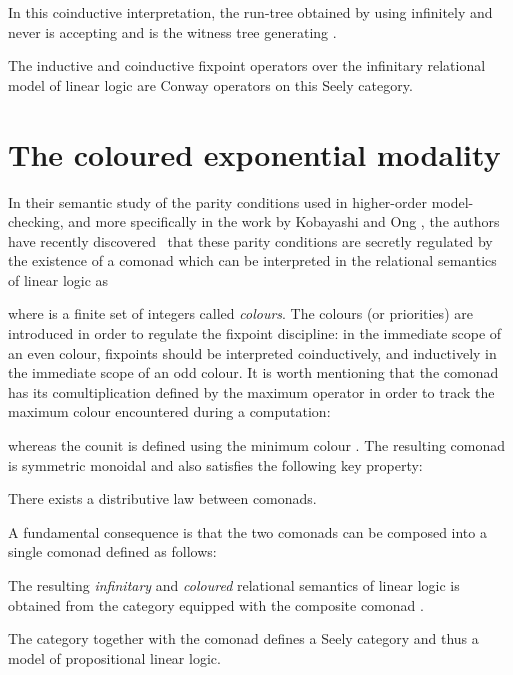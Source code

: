 \documentclass[runningheads,a4paper]{llncs}
\begin{document}
In this coinductive interpretation, the run-tree obtained by using infinitely  and never  is accepting and is the witness tree generating .


\begin{property}
The inductive and coinductive fixpoint operators over the infinitary relational model of linear logic are Conway operators on this Seely category.
\end{property}

\section{The coloured exponential modality}\label{section/coloured-modality}
In their semantic study of the parity conditions used in higher-order model-checking,
and more specifically in the work by Kobayashi and Ong \cite{kobayashi-ong},
the authors have recently discovered~\cite{coloured-tensorial-logic} that these parity conditions are secretly regulated
by the existence of a comonad  which can be interpreted in the relational semantics of linear logic
as 

where  is a finite set of integers called \emph{colours}.
The colours (or priorities) are introduced in order to regulate the fixpoint discipline:
in the immediate scope of an even colour, fixpoints should be interpreted coinductively,
and inductively in the immediate scope of an odd colour.
It is worth mentioning that the comonad~ has its comultiplication defined by the maximum operator
in order to track the maximum colour encountered during a computation:

whereas the counit is defined using the minimum colour .
The resulting comonad is symmetric monoidal and also satisfies the following key property:

\begin{property}
There exists a distributive law  between comonads.
\end{property}

\noindent
A fundamental consequence is that the two comonads can be composed 
into a single comonad  defined as follows:

The resulting \emph{infinitary} and \emph{coloured} relational semantics of linear logic
is obtained from the category  equipped with the composite comonad .

\begin{theorem}
The category  together with the comonad 
defines a Seely category and thus a model of propositional linear logic.
\end{theorem}
\end{document}
